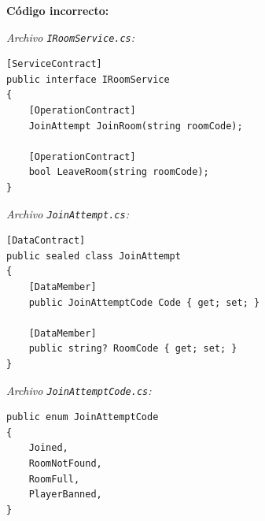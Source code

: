 \textbf{Código incorrecto:}

\textit{Archivo \texttt{IRoomService.cs}:}
\begin{lstlisting}[style=csharpstyle]
[ServiceContract]
public interface IRoomService
{
    [OperationContract]
    JoinAttempt JoinRoom(string roomCode);

    [OperationContract]
    bool LeaveRoom(string roomCode);
}
\end{lstlisting}

\textit{Archivo \texttt{JoinAttempt.cs}:}
\begin{lstlisting}[style=csharpstyle]
[DataContract]
public sealed class JoinAttempt
{
    [DataMember]
    public JoinAttemptCode Code { get; set; }

    [DataMember]
    public string? RoomCode { get; set; }
}
\end{lstlisting}

\textit{Archivo \texttt{JoinAttemptCode.cs}:}
\begin{lstlisting}[style=csharpstyle]
public enum JoinAttemptCode
{
    Joined,
    RoomNotFound,
    RoomFull,
    PlayerBanned,
}
\end{lstlisting}
